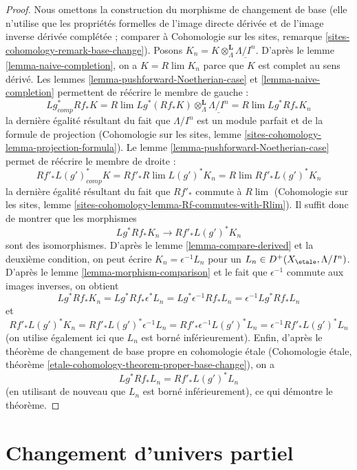 \begin{proof}
Nous omettons la construction du morphisme de changement de base (elle n'utilise que
les propriétés formelles de l'image directe dérivée et de l'image inverse dérivée complétée ;
comparer à
Cohomologie sur les sites, remarque \ref{sites-cohomology-remark-base-change}).
Posons $K_n = K \otimes^\mathbf{L}_\Lambda \underline{\Lambda/I^n}$.
D'après le lemme \ref{lemma-naive-completion}, on a $K = R\lim K_n$
parce que $K$ est complet au sens dérivé.
Les lemmes \ref{lemma-pushforward-Noetherian-case} et
\ref{lemma-naive-completion} permettent de réécrire le membre de gauche :
$$
Lg_{comp}^* Rf_* K =
R\lim Lg^*(Rf_*K)\otimes^\mathbf{L}_\Lambda \underline{\Lambda/I^n} =
R\lim Lg^* Rf_* K_n
$$
la dernière égalité résultant du fait que $\Lambda/I^n$ est un module parfait et de
la formule de projection (Cohomologie sur les sites, lemme
\ref{sites-cohomology-lemma-projection-formula}).
Le lemme \ref{lemma-pushforward-Noetherian-case} permet de réécrire le membre de
droite :
$$
Rf'_* L(g')^*_{comp} K =
Rf'_* R\lim L(g')^* K_n  =
R\lim Rf'_* L(g')^* K_n
$$
la dernière égalité résultant du fait que $Rf'_*$ commute à $R\lim$
(Cohomologie sur les sites, lemme
\ref{sites-cohomology-lemma-Rf-commutes-with-Rlim}).
Il suffit donc de montrer que les morphismes
$$
Lg^* Rf_* K_n \longrightarrow Rf'_* L(g')^* K_n
$$
sont des isomorphismes. D'après le lemme \ref{lemma-compare-derived} et la deuxième
condition, on peut écrire $K_n = \epsilon^{-1}L_n$ pour un
$L_n \in D^+(X_\etale, \Lambda/I^n)$. D'après le lemme \ref{lemma-morphism-comparison}
et le fait que $\epsilon^{-1}$ commute aux images inverses,
on obtient
$$
Lg^* Rf_* K_n =
Lg^* Rf_* \epsilon^*L_n =
Lg^* \epsilon^{-1} Rf_* L_n =
\epsilon^{-1} Lg^* Rf_* L_n
$$
et
$$
Rf'_* L(g')^* K_n =
Rf'_* L(g')^* \epsilon^{-1} L_n =
Rf'_* \epsilon^{-1} L(g')^* L_n =
\epsilon^{-1} Rf'_* L(g')^* L_n
$$
(on utilise également ici que $L_n$ est borné inférieurement).
Enfin, d'après le théorème de changement de base propre en cohomologie \'etale
(Cohomologie étale, théorème
\ref{etale-cohomology-theorem-proper-base-change}), on a
$$
Lg^* Rf_* L_n = Rf'_* L(g')^* L_n
$$
(en utilisant de nouveau que $L_n$ est borné inférieurement),
ce qui démontre le théorème.
\end{proof}






\section{Changement d'univers partiel}
\label{section-change-universe}


